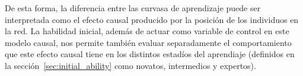 \documentclass[a4paper,11pt]{book}
\theoremstyle{definition}
\begin{document}
%
De esta forma, la diferencia entre las curvasa de aprendizaje puede ser interpretada como el efecto causal producido por la posición de los individuos en la red.
%
La habilidad inicial, además de actuar como variable de control en este modelo causal, nos permite también evaluar separadamente el comportamiento que este efecto causal tiene en los distintos estadíos del aprendiaje (definidos en la sección~\ref{sec:initial_ability} como novatos, intermedios y expertos).
%
%
%

%
%
%
%
\end{document}
